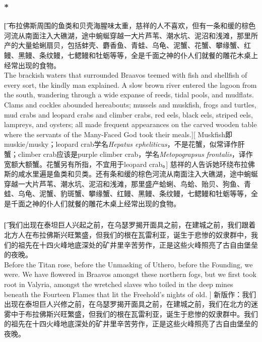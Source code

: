 \documentclass[12pt,a4paper]{article}
\begin{document}
\subsubsection{\color{red}*}\t[
	布拉佛斯周围的鱼类和贝壳海腥味太重，慈祥的人不喜欢，但有一条和缓的棕色河流从南面注入大礁湖，途中蜿蜒穿越一大片芦苇、潮水坑、泥沼和浅滩，那里所产的大量蛤蜊扇贝，包括蚌壳、麝香鱼、青蛙、乌龟、泥蟹、花蟹、攀缘蟹、红鳗、黑鳗、条纹鳗，七鳃鳗和牡蛎等等，全是千面之神的仆人们就餐的雕花木桌上经常出现的食物。\\
	The brackish waters that surrounded Braavos teemed with fish and shellfish of every sort, the kindly man explained. A slow brown river entered the lagoon from the south, wandering through a wide expanse of reeds, tidal pools, and mudflats. Clams and cockles abounded hereabouts; mussels and muskfish, frogs and turtles, mud crabs and leopard crabs and climber crabs, red eels, black eels, striped eels, lampreys, and oysters; all made frequent appearances on the carved wooden table where the servants of the Many-Faced God took their meals.][
	Muskfish即muskie/musky；leopard crab学名\emph{Hepatus epheliticus}，不是花蟹，似常译作肝蟹；climber crab应该是purple climber crab，学名\emph{Metopograpsus frontalis}，译作宽额大额蟹。花蟹另有所指，不宜用于leopard crab。]
	慈祥的人告诉她环绕布拉佛斯的咸水里遍是鱼类和贝类。还有条和缓的棕色河流从南面注入大礁湖，途中蜿蜒穿越一大片芦苇、潮水坑、泥沼和浅滩，那里盛产蛤蜊、鸟蛤、贻贝、狗鱼、青蛙、乌龟、泥蟹、豹斑蟹、攀缘蟹、红鳗、黑鳗、条纹鳗，七鳃鳗和牡蛎等等，全是千面之神的仆人们就餐的雕花木桌上经常出现的食物。
	
\subsubsection{}\t[
	我们出现在泰坦巨人兴起之前，在乌瑟罗揭开面具之前，在建城之前，我们跟着北方人在布拉佛斯兴旺繁盛，但我们的根在瓦雷利亚，诞生于悲惨的奴隶群中，我们的祖先在十四火峰地底深处的矿井里辛苦劳作，正是这些火峰照亮了古自由堡垒的夜晚。\\
	Before the Titan rose, before the Unmasking of Uthero, before the Founding, we were. We have flowered in Braavos amongst these northern fogs, but we first took root in Valyria, amongst the wretched slaves who toiled in the deep mines beneath the Fourteen Flames that lit the Freehold's nights of old. ]
	新版作：我们出现在泰坦巨人兴修之前，在乌瑟罗揭开面具之前，在建城之前，我们在北方的迷雾中于布拉佛斯兴旺繁盛，但我们的根在瓦雷利亚，诞生于悲惨的奴隶群中。我们的祖先在十四火峰地底深处的矿井里辛苦劳作，正是这些火峰照亮了古自由堡垒的夜晚。
	
\end{document}
